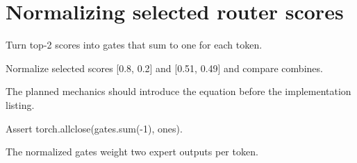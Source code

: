 \section{Normalizing selected router scores}
\label{sec:ch05-normalizing-selected-router-scores}

Turn top-2 scores into gates that sum to one for each token.



Normalize selected scores [0.8, 0.2] and [0.51, 0.49] and compare combines.



The planned mechanics should introduce the equation before the implementation listing.





\begin{checkpointbox}
Assert torch.allclose(gates.sum(-1), ones).
\end{checkpointbox}

The normalized gates weight two expert outputs per token.
